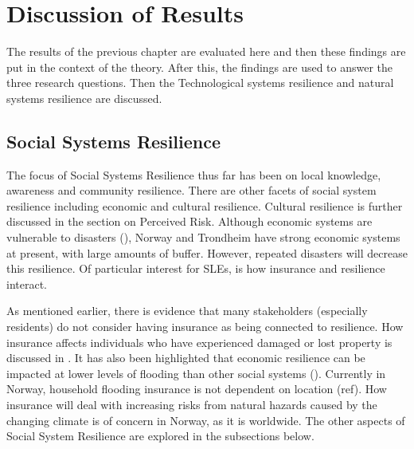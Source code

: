 

\chapter{Discussion of Results}
 The results of the previous chapter are evaluated here and then these findings are put in the context of the theory. After this, the findings are used to answer the three research questions. Then the Technological systems resilience and natural systems resilience are discussed.




\section{Social Systems Resilience}
The focus of Social Systems Resilience thus far has been on local knowledge, awareness and community resilience. There are other facets of social system resilience including economic and cultural resilience. Cultural resilience is further discussed in the section on Perceived Risk. Although economic systems are vulnerable to disasters (\cite{head_comment_2020}), Norway and Trondheim have strong economic systems at present, with large amounts of buffer. However, repeated disasters will decrease this resilience. Of particular interest for SLEs, is how insurance and resilience interact.

As mentioned earlier, there is evidence that many stakeholders (especially residents) do not consider having insurance as being connected to resilience. How insurance affects individuals who have experienced damaged or lost property is discussed in \cite{whitmarsh_are_2008}. It has also been highlighted that economic resilience can be impacted at lower levels of flooding than other social systems (\cite{cutter_community_2020}). Currently in Norway, household flooding insurance is not dependent on location (ref).  How insurance will deal with increasing risks from natural hazards caused by the changing climate is of concern in Norway, as it is worldwide. The other aspects of Social System Resilience are explored in the subsections below.


